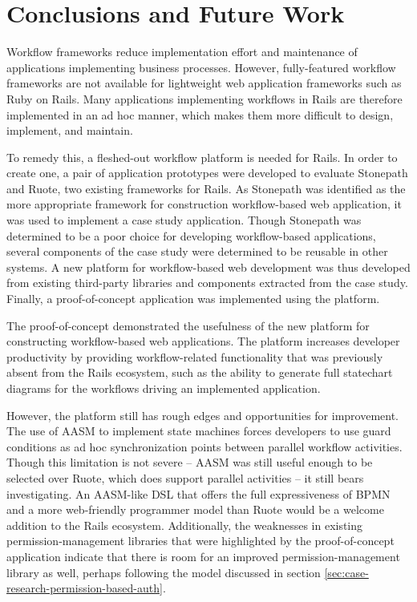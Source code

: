 \documentclass[document.tex]{subfiles}
\begin{document}
\chapter{Conclusions and Future Work}
\label {ch:conclusion}

Workflow frameworks reduce implementation effort and maintenance of applications implementing business processes. However, fully-featured workflow frameworks are not available for lightweight web application frameworks such as Ruby on Rails. Many applications implementing workflows in Rails are therefore implemented in an ad hoc manner, which makes them more difficult to design, implement, and maintain.

To remedy this, a fleshed-out workflow platform is needed for Rails. In order to create one, a pair of application prototypes were developed to evaluate Stonepath and Ruote, two existing frameworks for Rails. As Stonepath was identified as the more appropriate framework for construction workflow-based web application, it was used to implement a case study application. Though Stonepath was determined to be a poor choice for developing workflow-based applications, several components of the case study were determined to be reusable in other systems. A new platform for workflow-based web development was thus developed from existing third-party libraries and components extracted from the case study. Finally, a proof-of-concept application was implemented using the platform.

The proof-of-concept demonstrated the usefulness of the new platform for constructing workflow-based web applications. The platform increases developer productivity by providing workflow-related functionality that was previously absent from the Rails ecosystem, such as the ability to generate full statechart diagrams for the workflows driving an implemented application. 

However, the platform still has rough edges and opportunities for improvement. The use of AASM to implement state machines forces developers to use guard conditions as ad hoc synchronization points between parallel workflow activities. Though this limitation is not severe -- AASM was still useful enough to be selected over Ruote, which does support parallel activities -- it still bears investigating. An AASM-like DSL that offers the full expressiveness of BPMN and a more web-friendly programmer model than Ruote would be a welcome addition to the Rails ecosystem. Additionally, the weaknesses in existing permission-management libraries that were highlighted by the proof-of-concept application indicate that there is room for an improved permission-management library as well, perhaps following the model discussed in section \ref{sec:case-research-permission-based-auth}.
\end{document}
